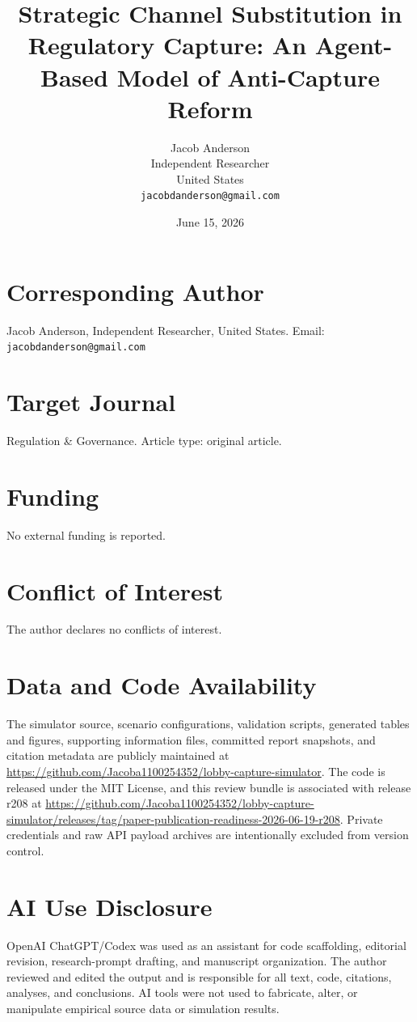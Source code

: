 \documentclass[11pt]{article}
\title{Strategic Channel Substitution in Regulatory Capture: An Agent-Based Model of Anti-Capture Reform}
\author{Jacob Anderson\\Independent Researcher\\United States\\\texttt{jacobdanderson@gmail.com}}
\date{June 15, 2026}
\begin{document}
\maketitle

\section*{Corresponding Author}
Jacob Anderson, Independent Researcher, United States. Email: \texttt{jacobdanderson@gmail.com}

\section*{Target Journal}
Regulation \& Governance. Article type: original article.

\section*{Funding}
No external funding is reported.

\section*{Conflict of Interest}
The author declares no conflicts of interest.

\section*{Data and Code Availability}
\begin{sloppypar}
The simulator source, scenario configurations, validation scripts, generated tables and figures, supporting information files, committed report snapshots, and citation metadata are publicly maintained at \url{https://github.com/Jacoba1100254352/lobby-capture-simulator}. The code is released under the MIT License, and this review bundle is associated with release r208 at \url{https://github.com/Jacoba1100254352/lobby-capture-simulator/releases/tag/paper-publication-readiness-2026-06-19-r208}. Private credentials and raw API payload archives are intentionally excluded from version control.
\end{sloppypar}

\section*{AI Use Disclosure}
OpenAI ChatGPT/Codex was used as an assistant for code scaffolding, editorial revision, research-prompt drafting, and manuscript organization. The author reviewed and edited the output and is responsible for all text, code, citations, analyses, and conclusions. AI tools were not used to fabricate, alter, or manipulate empirical source data or simulation results.
\end{document}
